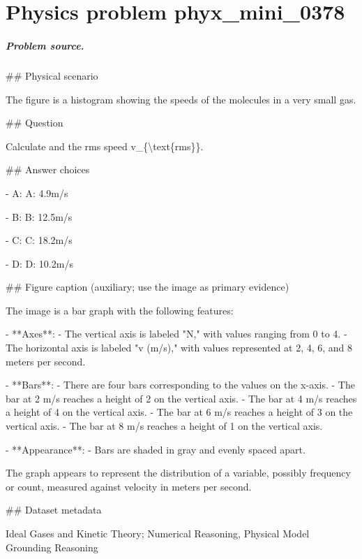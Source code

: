 
\chapter{Physics problem phyx\_mini\_0378}
\label{ch:PhyXMiniProblems_problem_phyx_mini_0378}

\paragraph{Problem source.}
\#\# Physical scenario

The figure is a histogram showing the speeds of the molecules in a very small gas.

\#\# Question

Calculate and the rms speed v\_\{\textbackslash{}text\{rms\}\}.

\#\# Answer choices

- A: A: 4.9m/s

- B: B: 12.5m/s

- C: C: 18.2m/s

- D: D: 10.2m/s

\#\# Figure caption (auxiliary; use the image as primary evidence)

The image is a bar graph with the following features:

- **Axes**: 
  - The vertical axis is labeled "N," with values ranging from 0 to 4.
  - The horizontal axis is labeled "v (m/s)," with values represented at 2, 4, 6, and 8 meters per second.

- **Bars**:
  - There are four bars corresponding to the values on the x-axis.
  - The bar at 2 m/s reaches a height of 2 on the vertical axis.
  - The bar at 4 m/s reaches a height of 4 on the vertical axis.
  - The bar at 6 m/s reaches a height of 3 on the vertical axis.
  - The bar at 8 m/s reaches a height of 1 on the vertical axis.

- **Appearance**:
  - Bars are shaded in gray and evenly spaced apart.

The graph appears to represent the distribution of a variable, possibly frequency or count, measured against velocity in meters per second.

\#\# Dataset metadata

Ideal Gases and Kinetic Theory; Numerical Reasoning, Physical Model Grounding Reasoning

